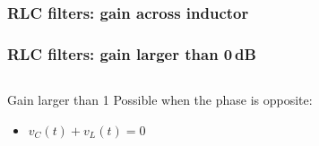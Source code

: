 \documentclass[beamer]{standalone}
\begin{document}
\begin{frame}
 \frametitle{RLC filters: gain across inductor}
 \begin{center}
 \end{center}
\end{frame}

\begin{frame}
 \frametitle{RLC filters: gain larger than 0\,dB}
 \begin{columns}
  \begin{column}{0.5\textwidth}
  \end{column}
  \begin{column}{0.5\textwidth}
  \end{column}
 \end{columns}
 \begin{block}{Gain larger than 1}
  Possible when the phase is opposite:
  \begin{itemize}
   \item $v_C(t) + v_L(t) = 0$
  \end{itemize}
 \end{block}
\end{frame}
\end{document}
